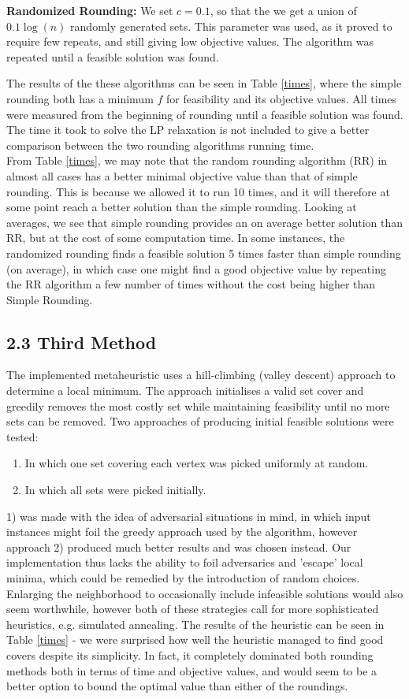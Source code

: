 \documentclass[12pt]{article}
\begin{document}
{\bf Randomized Rounding:} We set $c=0.1$, so that the we get a union of $0.1\log(n)$ randomly generated sets. This parameter was used, as it proved to require few repeats, and still giving low objective values. The algorithm was repeated until a feasible solution was found.

The results of the these algorithms can be seen in Table \ref{times}, where the simple rounding both has a minimum $f$ for feasibility and its objective values. All times were measured from the beginning of rounding until a feasible solution was found. The time it took to solve the LP relaxation is not included to give a better comparison between the two rounding algorithms running time.\\

From Table \ref{times}, we may note that the random rounding algorithm (RR) in almost all cases has a better minimal objective value than that of simple rounding. This is because we allowed it to run 10 times, and it will therefore at some point reach a better solution than the simple rounding. Looking at averages, we see that simple rounding provides an on average better solution than RR, but at the cost of some computation time. In some instances, the randomized rounding finds a feasible solution 5 times faster than simple rounding (on average), in which case one might find a good objective value by repeating the RR algorithm a few number of times without the cost being higher than Simple Rounding.  

\subsection*{2.3 Third Method}
The implemented metaheuristic uses a hill-climbing (valley descent) approach to determine a local minimum. The approach initialises a valid set cover and greedily removes the most costly set while maintaining feasibility until no more sets can be removed. Two approaches of producing initial feasible solutions were tested:
\begin{enumerate}
\item In which one set covering each vertex was picked uniformly at random.
\item In which all sets were picked initially.
\end{enumerate}
1) was made with the idea of adversarial situations in mind, in which input instances might foil the greedy approach used by the algorithm, however approach 2) produced much better results and was chosen instead. Our implementation thus lacks the ability to foil adversaries and 'escape' local minima, which could be remedied by the introduction of random choices. Enlarging the neighborhood to occasionally include infeasible solutions would also seem worthwhile, however both of these strategies call for more sophisticated heuristics, e.g. simulated annealing. The results of the heuristic can be seen in Table \ref{times} - we were surprised how well the heuristic managed to find good covers despite its simplicity. In fact, it completely dominated both rounding methods both in terms of time and objective values, and would seem to be a better option to bound the optimal value than either of the roundings.  
\end{document}
